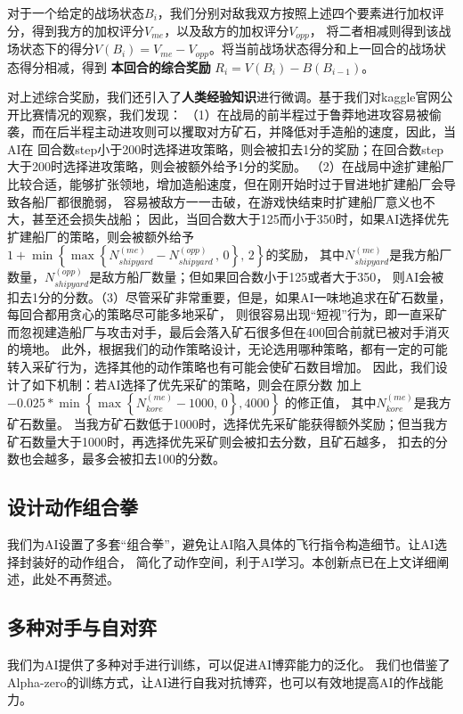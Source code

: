 \documentclass[10pt]{article}
\begin{document}
对于一个给定的战场状态$B_i$，我们分别对敌我双方按照上述四个要素进行加权评分，得到我方的加权评分$V_{me}$，以及敌方的加权评分$V_{opp}$，
将二者相减则得到该战场状态下的得分$V(B_i) = V_{me} - V_{opp}$。将当前战场状态得分和上一回合的战场状态得分相减，得到
\textbf{本回合的综合奖励} $R_i = V(B_i) - B(B_{i-1})$。

对上述综合奖励，我们还引入了\textbf{人类经验知识}进行微调。基于我们对kaggle官网公开比赛情况的观察，我们发现：
（1）在战局的前半程过于鲁莽地进攻容易被偷袭，而在后半程主动进攻则可以攫取对方矿石，并降低对手造船的速度，因此，当AI在
回合数step小于200时选择进攻策略，则会被扣去1分的奖励；在回合数step大于200时选择进攻策略，则会被额外给予1分的奖励。
（2）在战局中途扩建船厂比较合适，能够扩张领地，增加造船速度，但在刚开始时过于冒进地扩建船厂会导致各船厂都很脆弱，
容易被敌方一一击破，在游戏快结束时扩建船厂意义也不大，甚至还会损失战船；
因此，当回合数大于125而小于350时，如果AI选择优先扩建船厂的策略，则会被额外给予
$1 + \min\left\{\max\left\{N_{shipyard}^{(me)} - N_{shipyard}^{(opp)}\,,\, 0\right\},\,2\right\}$的奖励，
其中$N_{shipyard}^{(me)}$是我方船厂数量，$N_{shipyard}^{(opp)}$是敌方船厂数量；但如果回合数小于125或者大于350，
则AI会被扣去1分的分数。（3）尽管采矿非常重要，但是，如果AI一味地追求在矿石数量，每回合都用贪心的策略尽可能多地采矿，
则很容易出现“短视”行为，即一直采矿而忽视建造船厂与攻击对手，最后会落入矿石很多但在400回合前就已被对手消灭的境地。
此外，根据我们的动作策略设计，无论选用哪种策略，都有一定的可能转入采矿行为，选择其他的动作策略也有可能会使矿石数目增加。
因此，我们设计了如下机制：若AI选择了优先采矿的策略，则会在原分数
加上$-0.025 * \min \left\{\max \left\{ N_{kore}^{(me)} - 1000,\, 0\right\}, 4000\right\}$ 的修正值，
其中$N_{kore}^{(me)}$是我方矿石数量。
当我方矿石数低于1000时，选择优先采矿能获得额外奖励；但当我方矿石数量大于1000时，再选择优先采矿则会被扣去分数，且矿石越多，
扣去的分数也会越多，最多会被扣去100的分数。

\subsection{设计动作组合拳}
我们为AI设置了多套“组合拳”，避免让AI陷入具体的飞行指令构造细节。让AI选择封装好的动作组合，
简化了动作空间，利于AI学习。本创新点已在上文详细阐述，此处不再赘述。

\subsection{多种对手与自对弈}
我们为AI提供了多种对手进行训练，可以促进AI博弈能力的泛化。
我们也借鉴了Alpha-zero的训练方式，让AI进行自我对抗博弈，也可以有效地提高AI的作战能力。
\end{document}
